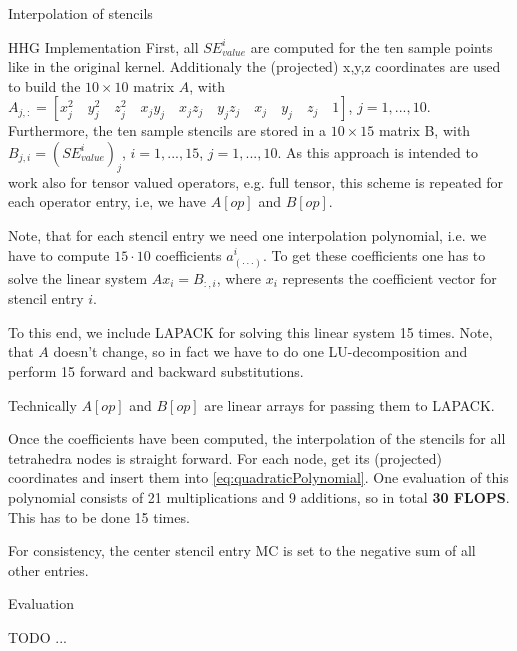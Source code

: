 \documentclass[a4paper,11pt,reqno]{amsart}
\numberwithin{figure}{section}
\numberwithin{table}{section}
\numberwithin{figure}{subsection}
\def\si{SE_{value}^i}
\begin{document}
\begin{section}{Interpolation of stencils}
\begin{subsection}{HHG Implementation}
First, all $\si$ are computed for the ten sample points like in the original kernel. 
Additionaly the (projected) x,y,z coordinates are used to build the $10\times10$ 
matrix $A$, with 
$A_{j,:} = \left[x_j^2\quad y_j^2\quad z_j^2\quad x_jy_j\quad x_jz_j\quad y_jz_j\quad
x_j\quad y_j\quad z_j\quad 1\right]$, $j = 1,...,10$.
Furthermore, the ten sample stencils are stored in a $10\times15$ matrix B,
with $B_{j,i} = \left(\si\right)_j$, $i = 1,...,15$, $j=1,...,10$. 
As this approach is intended to work 
also for tensor valued operators, e.g. full tensor, this scheme is repeated for each
operator entry, i.e, we have $A[op]$ and $B[op]$.

Note, that for each stencil entry we need one interpolation polynomial, i.e. we
have to compute $15\cdot10$ coefficients $a_{(\cdot\cdot\cdot)}^i$. To get these
coefficients one has to solve the linear system $Ax_i = B_{:,i}$,
where $x_i$ represents the coefficient vector for stencil entry $i$.

To this end, we include LAPACK for solving this linear system 15 times. 
Note, that $A$ doesn't change, so in fact we have to do one LU-decomposition
and perform 15 forward and backward substitutions.

Technically $A[op]$ and $B[op]$ are linear arrays for passing them to LAPACK. 

Once the coefficients have been computed, the interpolation of the stencils for
all tetrahedra nodes is straight forward. For each node, get its (projected) coordinates
and insert them into \eqref{eq:quadraticPolynomial}. One evaluation
of this polynomial consists of 21 multiplications and 9 additions, so in total 
\textbf{30 FLOPS}. This has to be done 15 times. 

For consistency, the center stencil
entry MC is set to the negative sum of all other entries.

\end{subsection}




\begin{subsection}{Evaluation}


TODO ...


\end{subsection}
\end{section}
\end{document}
